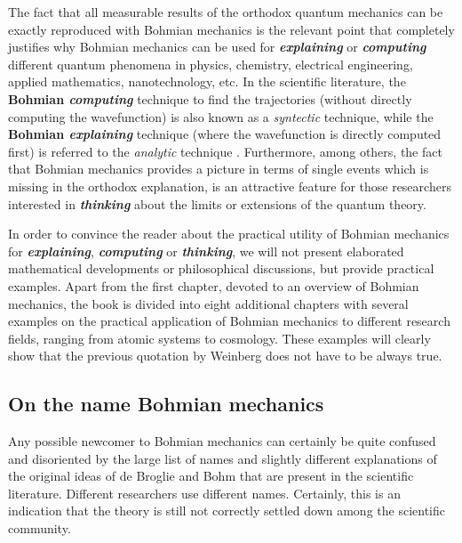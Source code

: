 \documentclass[onecolumn,nofootinbib, secnumarabic, amsmath, nobibnotes,12pt,aps,pra]{revtex4-1}
\begin{document}
The fact that all measurable results of the orthodox quantum mechanics can be exactly reproduced with Bohmian mechanics is the relevant point that completely justifies why Bohmian mechanics can be used for \textbf{\emph{explaining}} or \textbf{\emph{computing}} different quantum phenomena in physics, chemistry, electrical engineering, applied mathematics, nanotechnology, etc. In the scientific literature, the \textbf{Bohmian \emph{computing}} technique to find the trajectories (without directly computing the wavefunction) is also known as a \emph{syntectic} technique, while the \textbf{Bohmian \emph{explaining}} technique (where the wavefunction is directly computed first) is referred to the \emph{analytic} technique \cite{om.wyatt2005}. Furthermore, among others, the fact that Bohmian mechanics provides a picture in terms of single events which is missing in the orthodox explanation, is an attractive feature for those researchers interested in \textbf{\emph{thinking}} about the limits or extensions of the quantum theory.

In order to convince the reader about the practical utility of Bohmian mechanics for \textbf{\emph{explaining}}, \textbf{\emph{computing}} or \textbf{\emph{thinking}}, we will not present elaborated mathematical developments or philosophical discussions, but provide practical examples. Apart from the first chapter, devoted to an overview of Bohmian mechanics, the book is divided into eight additional chapters with several examples on the practical application of Bohmian mechanics to different research fields, ranging from atomic systems to cosmology. These examples will clearly show that the previous quotation by Weinberg does not have to be always true.


\subsection*{On the name Bohmian mechanics}

Any possible newcomer to Bohmian mechanics can certainly be quite confused and disoriented by the large list of names and slightly different explanations of the original ideas of de Broglie and Bohm that are present in the scientific literature. Different researchers use different names. Certainly, this is an indication that the theory is still not correctly settled down among the scientific community.
\end{document}
